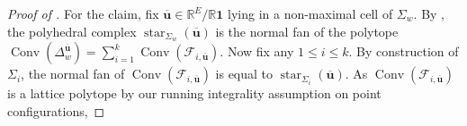 \documentclass[11pt]{amsart}
\newcommand{\RR}{\mathbb R}
\newcommand{\bu}{{\mathbf u}}
\theoremstyle{definition}
\begin{document}
\begin{proof}[Proof of ]
For the claim, fix $\overline\bu \in \RR^E/\RR\mathbf 1$ lying in a non-maximal cell of $\Sigma_{w}$. By \cite[Lemma 3.3.6]{MS15}, the polyhedral complex $\operatorname{star}_{\Sigma_{w}}(\overline\bu)$ is the normal fan of the polytope $\operatorname{Conv}(\Delta_{w}^{\overline\bu})=\sum_{i=1}^k \operatorname{Conv}(\mathcal F_{i,\overline \bu})$. Now fix any $1\leq i \leq k$.  By construction of $\Sigma_i$, the normal fan of $\operatorname{Conv}(\mathcal F_{i,\overline \bu})$ is equal to 
$\operatorname{star}_{\Sigma_i}(\overline\bu)$.
As $\operatorname{Conv}(\mathcal F_{i,\overline\bu})$ is a lattice polytope by our running integrality assumption on point configurations,

\end{proof}
\end{document}
